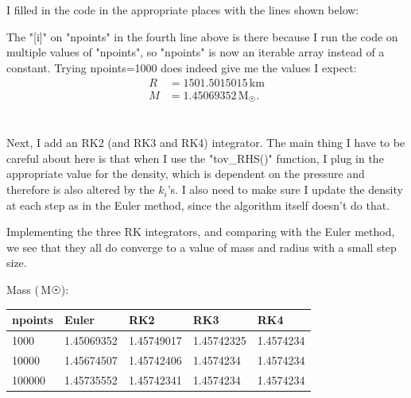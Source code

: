 \documentclass[11pt,letterpaper]{article}
\newcommand{\unit}[1]{\ensuremath{\, \mathrm{#1}}}
\begin{document}
\section{}

I filled in the code in the appropriate places with the lines shown below:




The "[i]" on "npoints" in the fourth line above is there because I run the 
code on multiple values of "npoints", so "npoints" is now an iterable array 
instead of a constant. Trying npoints=1000 does indeed give me the values I expect:
\begin{align*}
R &= 1501.5015015 \unit{km} \\
M &= 1.45069352 \unit{M_{\astrosun}}.
\end{align*}


\section{}

Next, I add an RK2 (and RK3 and RK4) integrator. The main thing I have to be careful 
about here is that when I use the "tov\_RHS()" function, I plug in the appropriate
value for the density, which is dependent on the pressure and therefore is also 
altered by the $k_i$'s. I also need to make sure I update the density at each step as
in the Euler method, since the algorithm itself doesn't do that.

Implementing the three RK integrators, and comparing with the Euler method, we see
that they all do converge to a value of mass and radius with a small step size.

Mass ($\unit{M\astrosun}$):
\begin{center}
    \begin{tabular}{| l | l | l | l | l |}
    \hline
    npoints & Euler & RK2 & RK3 & RK4 \\ \hline
    1000 & 1.45069352 & 1.45749017 & 1.45742325 & 1.4574234 \\ \hline
    10000 & 1.45674507 & 1.45742406 & 1.4574234 & 1.4574234 \\ \hline
    100000 & 1.45735552 & 1.45742341 & 1.4574234 & 1.4574234  \\
    \hline
    \end{tabular}
\end{center} 
\end{document}

